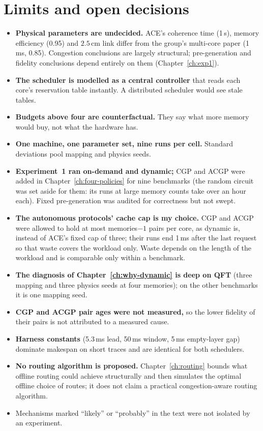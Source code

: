 \chapter{Limits and open decisions}
\label{ch:limits}

\begin{itemize}
  \item \textbf{Physical parameters are undecided.} ACE's coherence time (1\,s), memory efficiency (0.95) and $2.5$\,cm link differ from the group's multi-core paper (1\,ms, 0.85). Congestion conclusions
        are largely structural; pre-generation and fidelity conclusions depend entirely on them (Chapter~\ref{ch:exp1}).
  \item \textbf{The scheduler is modelled as a central controller} that reads each core's reservation table instantly. A distributed scheduler would see stale tables.
  \item \textbf{Budgets above four are counterfactual.} They say what more memory would buy, not what the hardware has.
  \item \textbf{One machine, one parameter set, nine runs per cell.} Standard deviations pool mapping and physics seeds.
  \item \textbf{Experiment~1 ran on-demand and dynamic;} CGP and ACGP were added in Chapter~\ref{ch:four-policies} for nine benchmarks (the random circuit was set aside for them: its runs at large memory counts take over an hour each). Fixed pre-generation was audited for correctness but not swept.
  \item \textbf{The autonomous protocols' cache cap is my choice.} CGP and ACGP were allowed to hold at most memories$-1$ pairs per core, as dynamic is, instead of ACE's fixed cap of three; their runs end 1\,ms after the last request so that waste covers the workload only. Waste depends on the length of the workload and is comparable only within a benchmark.
  \item \textbf{The diagnosis of Chapter~\ref{ch:why-dynamic} is deep on QFT} (three mapping and three physics seeds at four memories); on the other benchmarks it is one mapping seed.
  \item \textbf{CGP and ACGP pair ages were not measured,} so the lower fidelity of their pairs is not attributed to a measured cause.
  \item \textbf{Harness constants} (5.3\,ms lead, 50\,ms window, 5\,ms empty-layer gap) dominate makespan on short traces and are identical for both schedulers.
  \item \textbf{No routing algorithm is proposed.} Chapter~\ref{ch:routing} bounds what offline routing could achieve structurally and then simulates the optimal offline choice of routes; it does not claim a practical congestion-aware routing algorithm.
  \item Mechanisms marked ``likely'' or ``probably'' in the text were not isolated by an experiment.
\end{itemize}
